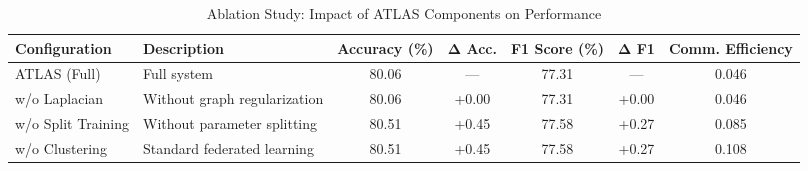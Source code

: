 \begin{table}[!t]
\renewcommand{\arraystretch}{1.2}
\caption{Ablation Study: Impact of ATLAS Components on Performance}
\label{tab:ablation}
\centering
\small
\begin{tabular}{l|p{4cm}|cc|cc|c}
\hline\hline
Configuration & Description & Accuracy (\%) & Δ Acc. & F1 Score (\%) & Δ F1 & Comm. Efficiency \\
\hline
ATLAS (Full) & Full system & 80.06 & — & 77.31 & — & 0.046 \\
w/o Laplacian & Without graph regularization & 80.06 & +0.00 & 77.31 & +0.00 & 0.046 \\
w/o Split Training & Without parameter splitting & 80.51 & +0.45 & 77.58 & +0.27 & 0.085 \\
w/o Clustering & Standard federated learning & 80.51 & +0.45 & 77.58 & +0.27 & 0.108 \\
\hline\hline
\end{tabular}
\end{table}
